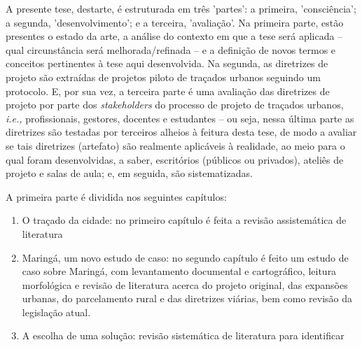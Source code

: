 \documentclass[12pt, a4paper]{book} %
\begin{document}
            A presente tese, destarte, é estruturada em três 'partes': a primeira, 'consciência'; a segunda, 'desenvolvimento'; e a terceira, 'avaliação'. Na primeira parte, estão presentes o estado da arte, a análise do contexto em que a tese será aplicada – qual circunstância será melhorada/refinada – e a definição de novos termos e conceitos pertinentes à tese aqui desenvolvida. Na segunda, as diretrizes de projeto são extraídas de projetos piloto de traçados urbanos seguindo um protocolo. E, por sua vez, a terceira parte é uma avaliação das diretrizes de projeto por parte dos \textit{stakeholders} do processo de projeto de traçados urbanos, \textit{i.e.,} profissionais, gestores, docentes e estudantes – ou seja, nessa última parte as diretrizes são testadas por terceiros alheios à feitura desta tese, de modo a avaliar se tais diretrizes (artefato) são realmente aplicáveis à realidade, ao meio para o qual foram desenvolvidas, a saber, escritórios (públicos ou privados), ateliês de projeto e salas de aula; e, em seguida, são sistematizadas.

            A primeira parte é dividida nos seguintes capítulos:
            \begin{enumerate}
                \item O traçado da cidade: no primeiro capítulo é feita a revisão assistemática de literatura
                
                \item Maringá, um novo estudo de caso: no segundo capítulo é feito um estudo de caso sobre Maringá, com levantamento documental e cartográfico, leitura morfológica e revisão de literatura acerca do projeto original, das expansões urbanas, do parcelamento rural e das diretrizes viárias, bem como revisão da legislação atual.
                \item A escolha de uma solução: revisão sistemática de literatura para identificar 
            \end{enumerate}
\end{document}
